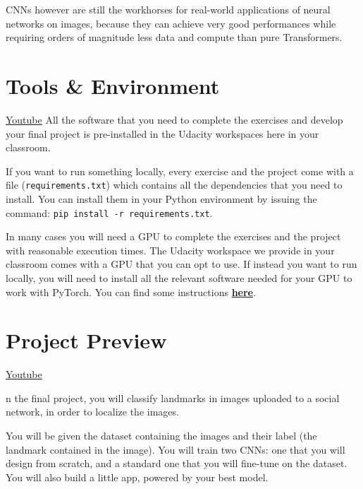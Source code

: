 CNNs however are still the workhorses for real-world applications of neural networks on images, because they can achieve very good performances while requiring orders of magnitude less data and compute than pure Transformers.

\section{Tools \& Environment}
\href{https://www.youtube.com/watch?v=qV-o9eVOWTs&ab_channel=Udacity}{Youtube} \newline
All the software that you need to complete the exercises and develop your final project is pre-installed in the Udacity workspaces here in your classroom.\newline

If you want to run something locally, every exercise and the project come with a file (\verb|requirements.txt|) which contains all the dependencies that you need to install. You can install them in your Python environment by issuing the command: \verb|pip install -r requirements.txt|.\newline

In many cases you will need a GPU to complete the exercises and the project with reasonable execution times. The Udacity workspace we provide in your classroom comes with a GPU that you can opt to use. If instead you want to run locally, you will need to install all the relevant software needed for your GPU to work with PyTorch. You can find some instructions \href{https://pytorch.org/get-started/locally/}{\textbf{here}}.\newline

\section{Project Preview}
\href{https://www.youtube.com/watch?v=4R5eOA7hCuA&t=3s&ab_channel=Udacity}{Youtube} \newline

n the final project, you will classify landmarks in images uploaded to a social network, in order to localize the images. \newline

You will be given the dataset containing the images and their label (the landmark contained in the image). You will train two CNNs: one that you will design from scratch, and a standard one that you will fine-tune on the dataset. You will also build a little app, powered by your best model.
